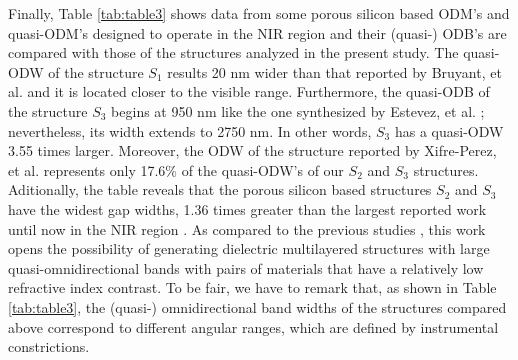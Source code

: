 \documentclass[a4paper,fleqn]{cas-sc}
\newcommand{\hl}[1]{{\color{blue}#1}}
\begin{document}
Finally, Table \ref{tab:table3} shows data from some porous
silicon based ODM's \hl{and quasi-ODM's designed to operate in the NIR
region and their (quasi-) ODB's are compared with those of
the structures analyzed in the present study. The quasi-ODW}
of the structure $S_1$ results 20 nm wider than that reported by Bruyant,
et al. \cite{Bruyant2003} and it is located closer to the visible range. Furthermore,
\hl{the quasi-ODB of the structure $S_3$} begins at 950 nm like the one
synthesized by Estevez, et al. \cite{Estevez2009}; nevertheless, its width extends to 2750
nm. In other words, $S_3$ has a quasi-ODW 3.55 times larger. Moreover, the
ODW of the structure reported by Xifre-Perez, et al. \cite{Xifre2005} represents only 17.6\%
of the \hl{quasi-ODW's of our $S_2$ and $S_3$ structures}. Aditionally, the table
reveals that the porous silicon based
structures $S_2$ and $S_3$ have the widest gap widths, 1.36 times greater than the
largest reported work until now in the NIR region \cite{Wu2021}.
As compared to the previous studies
\cite{Bruyant2003,Estevez2009,Xifre2005,Wu2021,Fink1998}, this work
opens the possibility of generating dielectric multilayered
\hl{structures with large quasi-omnidirectional bands with pairs of
materials that have a relatively low refractive index contrast. To be
fair, we have to remark that, as shown in Table \ref{tab:table3}, the
(quasi-) omnidirectional band widths of the structures compared above
correspond to different angular ranges,
which are defined by instrumental constrictions.}
\end{document}
